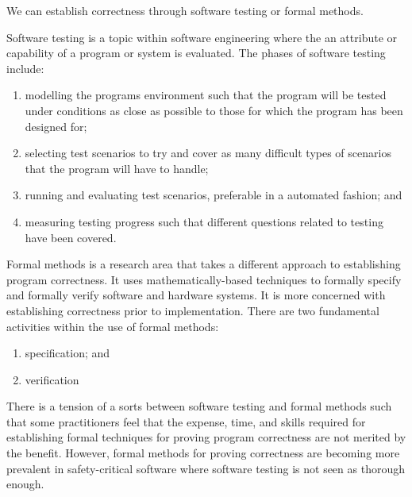 We can establish correctness through software testing or formal methods.

\begin{definition}
    Software testing is a topic within software engineering where the an attribute or capability of a program or system is evaluated. The phases of software testing include:
    \begin{enumerate}
        \item modelling the programs environment such that the program will be tested under conditions as close as possible to those for which the program has been designed for;
        \item selecting test scenarios to try and cover as many difficult types of scenarios that the program will have to handle;
        \item running and evaluating test scenarios, preferable in a automated fashion; and
        \item measuring testing progress such that different questions related to testing have been covered.
    \end{enumerate}
\end{definition}

\begin{definition}
    Formal methods is a research area that takes a different approach to establishing program correctness. It uses mathematically-based techniques to formally specify and formally verify software and hardware systems. It is more concerned with establishing correctness prior to implementation. There are two fundamental activities within the use of formal methods:
    \begin{enumerate}
        \item specification; and
        \item verification
    \end{enumerate}
\end{definition}

\begin{remark}
    There is a tension of a sorts between software testing and formal methods such that some practitioners feel that the expense, time, and skills required for establishing formal techniques for proving program correctness are not merited by the benefit. However, formal methods for proving correctness are becoming more prevalent in safety-critical software where software testing is not seen as thorough enough.
\end{remark}


